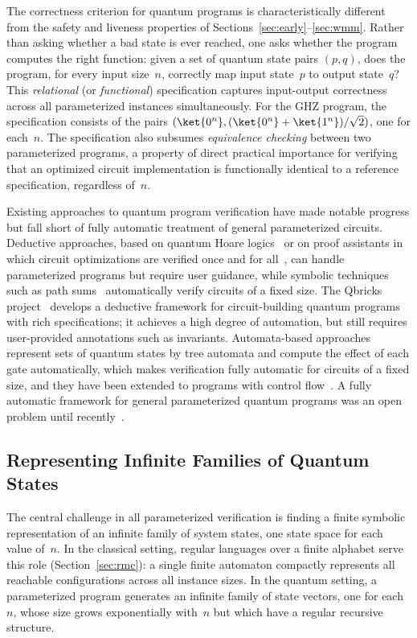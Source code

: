 The correctness criterion for quantum programs is characteristically different
from the safety and liveness properties of
Sections~\ref{sec:early}--\ref{sec:wmm}. Rather than asking whether a bad
state is ever reached, one asks whether the program computes the right
function: given a set of quantum state pairs $(p, q)$, does the program, for
every input size~$n$, correctly map input state~$p$ to output state~$q$? This
\emph{relational} (or \emph{functional}) specification captures input-output
correctness across all parameterized instances simultaneously. For the GHZ
program, the specification consists of the pairs $(\ket{0^n}, (\ket{0^n} +
\ket{1^n})/\sqrt{2})$, one for each~$n$. The specification also subsumes
\emph{equivalence checking} between two parameterized programs, a property of
direct practical importance for verifying that an optimized circuit
implementation is functionally identical to a reference specification,
regardless of~$n$.

Existing approaches to quantum program verification have made notable progress
but fall short of fully automatic treatment of general parameterized circuits.
Deductive approaches, based on quantum Hoare logics~\cite{Yin11} or on proof
assistants in which circuit optimizations are verified once and for
all~\cite{HRHWH21}, can handle parameterized programs but require user
guidance, while symbolic techniques such as path sums~\cite{Amy19}
automatically verify circuits of a fixed size. The Qbricks
project~\cite{Qbricks} develops a deductive framework for circuit-building
quantum programs with rich specifications; it achieves a high degree of
automation, but still requires user-provided annotations such as invariants.
Automata-based approaches~\cite{CCLLTY23,CCLLT23,LSTA25} represent sets of
quantum states by tree automata and compute the effect of each gate
automatically, which makes verification fully automatic for circuits of a
fixed size, and they have been extended to programs with control
flow~\cite{AutoQ20}. A fully automatic framework for general parameterized
quantum programs was an open problem until recently~\cite{AutoQPara}.

\subsection{Representing Infinite Families of Quantum States}

The central challenge in all parameterized verification is finding a finite
symbolic representation of an infinite family of system states, one state
space for each value of~$n$. In the classical setting, regular languages over
a finite alphabet serve this role (Section~\ref{sec:rmc}): a single finite
automaton compactly represents all reachable configurations across all
instance sizes. In the quantum setting, a parameterized program generates an
infinite family of state vectors, one for each~$n$, whose size grows
exponentially with~$n$ but which have a regular recursive structure.

